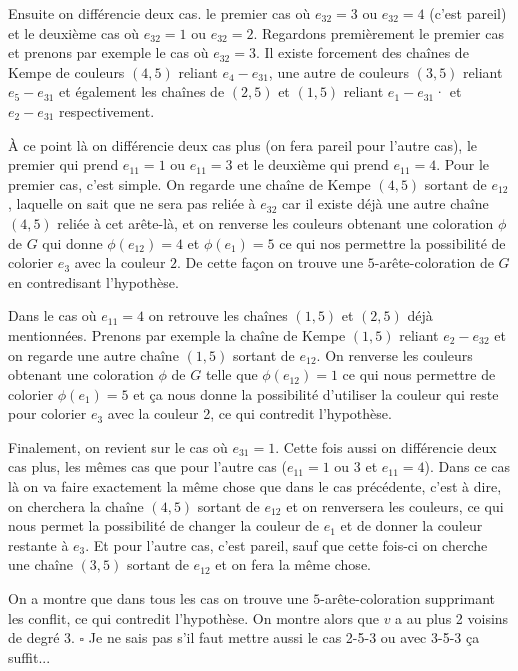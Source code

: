 \documentclass[10pt,a4paper]{article}
\newcommand{\ep}{{\hfill $\square$}}
\begin{document}
Ensuite on différencie deux cas. le premier cas où $e_{32} = 3$ ou $e_{32} = 4$ (c'est pareil) et le deuxième cas où $e_{32} = 1$ ou $e_{32} = 2$. Regardons premièrement le premier cas et prenons par exemple le cas où $e_{32} = 3$. Il existe forcement des chaînes de Kempe de couleurs $(4,5)$ reliant $e_4 -e_{31}$, une autre de couleurs $(3,5)$ reliant $e_5 -e_{31}$ et également les chaînes de $(2,5)$ et $(1,5)$ reliant $e_1 -e_{31}$· et $e_2 -e_{31}$ respectivement. 

À ce point là on différencie deux cas plus (on fera pareil pour l'autre cas), le premier qui prend $e_{11} = 1$ ou $e_{11} = 3$ et le deuxième qui prend $e_{11} = 4$. Pour le premier cas, c'est simple. On regarde une chaîne de Kempe $(4,5)$ sortant de $e_{12}$, laquelle on sait que ne sera pas reliée à $e_{32}$ car il existe déjà une autre chaîne $(4,5)$ reliée à cet arête-là, et on renverse les couleurs obtenant une coloration $\phi$ de $G$ qui donne $\phi (e_{12}) = 4$ et $\phi(e_1) = 5$ ce qui nos permettre la possibilité de colorier $e_3$ avec la couleur $2$. De cette façon on trouve une $5$-arête-coloration de $G$ en contredisant l'hypothèse. 

Dans le cas où $e_{11} =4$ on retrouve les chaînes $(1,5)$ et $(2,5)$ déjà mentionnées. Prenons par exemple la chaîne de Kempe $(1,5)$ reliant $e_2 -e_{32}$ et on regarde une autre chaîne $(1,5)$ sortant de $e_{12}$. On renverse les couleurs obtenant une coloration $\phi$ de $G$ telle que $\phi(e_{12})=1$ ce qui nous permettre de colorier $\phi(e_1) = 5$ et ça nous donne la possibilité d'utiliser la couleur qui reste pour colorier $e_3$ avec la couleur 2, ce qui contredit l'hypothèse.

Finalement, on revient sur le cas où $e_{31} = 1$. Cette fois aussi on différencie deux cas plus, les mêmes cas que pour l'autre cas ($e_{11} = 1$ ou $3$ et $e_{11} = 4$). Dans ce cas là on va faire exactement la même chose que dans le cas précédente, c'est à dire, on cherchera la chaîne $(4,5)$ sortant de $e_{12}$ et on renversera les couleurs, ce qui nous permet la possibilité de changer la couleur de $e_1$ et de donner la couleur restante à $e_3$. Et pour l'autre cas, c'est pareil, sauf que cette fois-ci on cherche une chaîne $(3,5)$ sortant de $e_{12}$ et on fera la même chose. 

On a montre que dans tous les cas on trouve une $5$-arête-coloration supprimant les conflit, ce qui contredit l'hypothèse. On montre alors que $v$ a au plus 2 voisins de degré 3.
\ep
{\color{red} Je ne sais pas s'il faut mettre aussi le cas 2-5-3 ou avec 3-5-3 ça suffit...}
\end{document}
